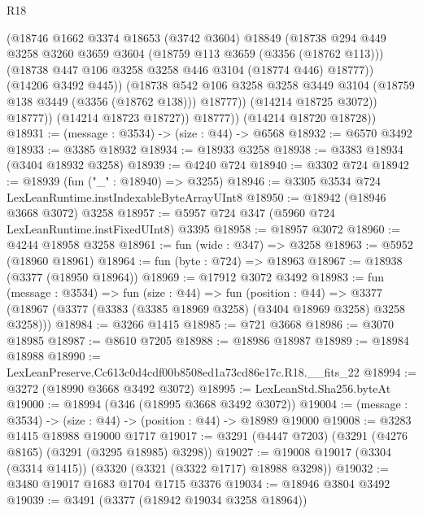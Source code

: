 \begin{lexlean}{R18}
\begin{coremodule}
                    (@18746
                      @1662
                      @3374
                      @18653
                      (@3742 @3604)
                      @18849
                      (@18738
                        @294
                        @449
                        @3258
                        @3260
                        @3659
                        @3604
                        (@18759 @113 @3659 (@3356 (@18762 @113)))
                        (@18738 @447 @106 @3258 @3258 @446 @3104 (@18774 @446) @18777))
                      (@14206 @3492 @445))
                    (@18738
                      @542
                      @106
                      @3258
                      @3258
                      @3449
                      @3104
                      (@18759 @138 @3449 (@3356 (@18762 @138)))
                      @18777))
                  (@14214 @18725 @3072))
                @18777))
            (@14214 @18723 @18727))
          @18777))
      (@14214 @18720 @18728))
@18931 := (message : @3534) -> (size : @44) -> @6568
@18932 := @6570 @3492
@18933 := @3385 @18932
@18934 := @18933 @3258
@18938 := @3383 @18934 (@3404 @18932 @3258)
@18939 := @4240 @724
@18940 := @3302 @724
@18942 := @18939 (fun ("_" : @18940) => @3255)
@18946 := @3305 @3534 @724 LexLeanRuntime.instIndexableByteArrayUInt8
@18950 := @18942 (@18946 @3668 @3072) @3258
@18957 := @5957 @724 @347 (@5960 @724 LexLeanRuntime.instFixedUInt8) @3395
@18958 := @18957 @3072
@18960 := @4244 @18958 @3258
@18961 := fun (wide : @347) => @3258
@18963 := @5952 (@18960 @18961)
@18964 := fun (byte : @724) => @18963
@18967 := @18938 (@3377 (@18950 @18964))
@18969 := @17912 @3072 @3492
@18983 := fun (message : @3534) =>
  fun (size : @44) =>
  fun (position : @44) =>
  @3377 (@18967 (@3377 (@3383 (@3385 @18969 @3258) (@3404 @18969 @3258) @3258 @3258)))
@18984 := @3266 @1415
@18985 := @721 @3668
@18986 := @3070 @18985
@18987 := @8610 @7205
@18988 := @18986 @18987
@18989 := @18984 @18988
@18990 := LexLeanPreserve.Cc613c0d4cdf00b8508ed1a73cd86e17c.R18.__fits_22
@18994 := @3272 (@18990 @3668 @3492 @3072)
@18995 := LexLeanStd.Sha256.byteAt
@19000 := @18994 (@346 (@18995 @3668 @3492 @3072))
@19004 := (message : @3534) -> (size : @44) -> (position : @44) -> @18989 @19000
@19008 := @3283 @1415 @18988 @19000 @1717
@19017 := @3291 (@4447 @7203) (@3291 (@4276 @8165) (@3291 (@3295 @18985) @3298))
@19027 := @19008 @19017 (@3304 (@3314 @1415)) (@3320 (@3321 (@3322 @1717) @18988 @3298))
@19032 := @3480 @19017 @1683 @1704 @1715 @3376
@19034 := @18946 @3804 @3492
@19039 := @3491 (@3377 (@18942 @19034 @3258 @18964))

\end{coremodule}
\end{lexlean}
